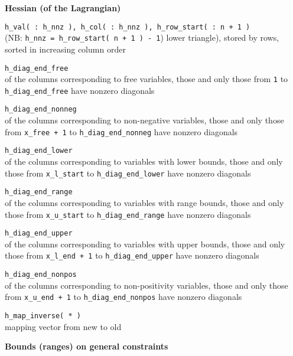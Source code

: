 \documentclass[twoside]{article}
\newcommand{\alist}[2]{\begin{#1}{#2}\end{#1}}
\newcommand{\dlist}[1]{\alist{description}{#1}}
\newcommand{\header}[1]{\vspace{5mm}

\noindent
\textbf{\large {#1}}}
\begin{document}
\clearpage

\header{Hessian (of the Lagrangian)}

\dlist{
\item[{\tt h\_val( : h\_nnz ), h\_col( : h\_nnz ), h\_row\_start( : n + 1 )}]
 \mbox{} \\
    (NB: {\tt h\_nnz = h\_row\_start( n + 1 ) - 1})
     lower triangle), stored by rows, sorted in increasing column order
\item[{\tt h\_diag\_end\_free}] \mbox{} \\
     of the columns corresponding to free variables, those and only those
     from {\tt 1} to {\tt h\_diag\_end\_free} have nonzero diagonals
\item[{\tt h\_diag\_end\_nonneg}] \mbox{} \\
     of the columns corresponding to non-negative variables, those and only
     those from {\tt x\_free + 1} to {\tt h\_diag\_end\_nonneg} have nonzero
     diagonals
\item[{\tt h\_diag\_end\_lower}] \mbox{} \\
     of the columns corresponding to variables with lower bounds, those and
     only those from
     {\tt x\_l\_start} to {\tt h\_diag\_end\_lower} have nonzero diagonals
\item[{\tt h\_diag\_end\_range}] \mbox{} \\
     of the columns corresponding to variables with range bounds, those and
     only those from
     {\tt x\_u\_start} to {\tt h\_diag\_end\_range} have nonzero diagonals
\item[{\tt h\_diag\_end\_upper}] \mbox{} \\
     of the columns corresponding to variables with upper bounds, those and
     only those from
     {\tt x\_l\_end + 1} to {\tt h\_diag\_end\_upper} have nonzero diagonals
\item[{\tt h\_diag\_end\_nonpos}] \mbox{} \\
     of the columns corresponding to non-positivity variables, those and only
     those from
     {\tt x\_u\_end + 1} to {\tt h\_diag\_end\_nonpos} have nonzero diagonals
\item[{\tt h\_map\_inverse( * )}] \mbox{} \\
     mapping vector from new to old
}

\header{Bounds (ranges) on general constraints}
\end{document}
